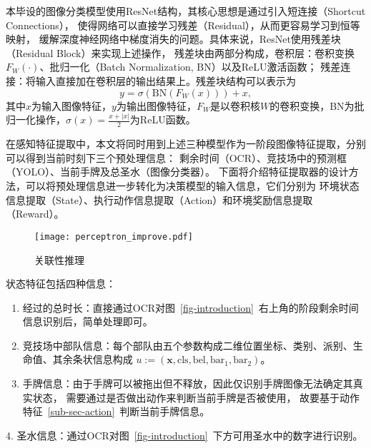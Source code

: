 本毕设的图像分类模型使用ResNet结构，其核心思想是通过引入短连接（Shortcut Connections），
使得网络可以直接学习残差（Residual），从而更容易学习到恒等映射，
缓解深度神经网络中梯度消失的问题。具体来说，ResNet使用残差块（Residual Block）来实现上述操作，
残差块由两部分构成，卷积层：卷积变换$F_W(\cdot)$、批归一化（Batch Normalization, BN）以及ReLU激活函数；
残差连接：将输入直接加在卷积层的输出结果上。残差块结构可以表示为
\begin{equation}
  y = \sigma(\text{BN}(F_W(x))) + x,
\end{equation}
其中$x$为输入图像特征，$y$为输出图像特征，$F_W$是以卷积核$W$的卷积变换，BN为批归一化操作，$\sigma(x)=\frac{x+|x|}{2}$为ReLU函数。

在感知特征提取中，本文将同时用到上述三种模型作为一阶段图像特征提取，分别可以得到当前时刻下三个预处理信息：
剩余时间（OCR）、竞技场中的预测框（YOLO）、当前手牌及总圣水（图像分类器）。
下面将介绍特征提取器的设计方法，可以将预处理信息进一步转化为决策模型的输入信息，它们分别为
环境状态信息提取（State）、执行动作信息提取（Action）和环境奖励信息提取（Reward）。
\begin{wrapfigure}[13]{r}{.5\textwidth} %
  \centering
  \vspace{-1ex}
  \texttt{[image: perceptron\_improve.pdf]}
  \vspace{-1ex}
  \caption{关联性推理}
  \label{fig-state-connect}
\end{wrapfigure}
\vspace{-3ex}
状态特征包括四种信息：
\begin{enumerate}
  \item 经过的总时长：直接通过OCR对图~\ref{fig-introduction}~右上角的阶段剩余时间信息识别后，简单处理即可。
  \item 竞技场中部队信息：每个部队由五个参数构成二维位置坐标、类别、派别、生命值、其余条状信息构成
  $u:=(\boldsymbol{x}, \text{cls}, \text{bel}, \text{bar}_1, \text{bar}_2)$。
  \item 手牌信息：由于手牌可以被拖出但不释放，因此仅识别手牌图像无法确定其真实状态，
  需要通过是否做出动作来判断当前手牌是否被使用，
  故要基于动作特征~\ref{sub-sec-action}~判断当前手牌信息。
\end{enumerate}

\noindent\hspace{1em} 4. 圣水信息：通过OCR对图~\ref{fig-introduction}~下方可用圣水中的数字进行识别。

